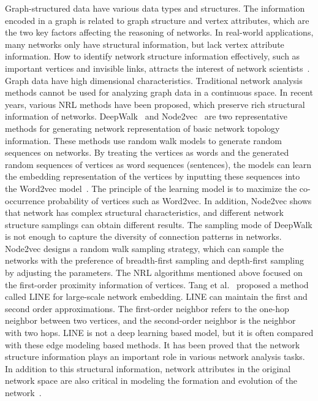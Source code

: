 Graph-structured data have various data types and structures. The information encoded in a graph is related to graph structure and vertex attributes, which are the two key factors affecting the reasoning of networks. In real-world applications, many networks only have structural information, but lack vertex attribute information. How to identify network structure information effectively, such as important vertices and invisible links, attracts the interest of network scientists~. Graph data have high dimensional characteristics. Traditional network analysis methods cannot be used for analyzing graph data in a continuous space.
In recent years, various NRL methods have been proposed, which preserve rich structural information of networks. DeepWalk~ and Node2vec~ are two representative methods for generating network representation of basic network topology information. These methods use random walk models to generate random sequences on networks. By treating the vertices as words and the generated random sequences of vertices as word sequences (sentences), the models can learn the embedding representation of the vertices by inputting these sequences into the Word2vec model~. The principle of the learning model is to maximize the co-occurrence probability of vertices such as Word2vec. In addition, Node2vec shows that network has complex structural characteristics, and different network structure samplings can obtain different results. The sampling mode of DeepWalk is not enough to capture the diversity of connection patterns in networks. Node2vec designs a random walk sampling strategy, which can sample the networks with the preference of breadth-first sampling and depth-first sampling by adjusting the parameters.
The NRL algorithms mentioned above focused on the first-order proximity information of vertices. Tang et al.~ proposed a method called LINE for large-scale network embedding. LINE can maintain the first and second order approximations. The first-order neighbor refers to the one-hop neighbor between two vertices, and the second-order neighbor is the neighbor with two hops. LINE is not a deep learning based model, but it is often compared with these edge modeling based methods.
It has been proved that the network structure information plays an important role in various network analysis tasks. In addition to this structural information, network attributes in the original network space are also critical in modeling the formation and evolution of the network~.

